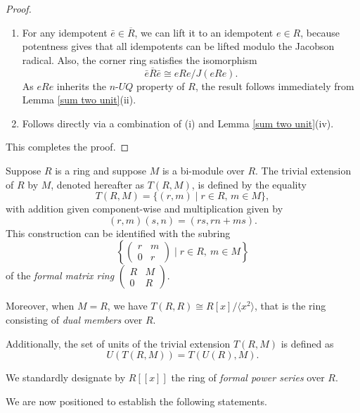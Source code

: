 \documentclass[10pt,a4paper]{amsart}
\begin{document}
\begin{proof}
\begin{enumerate}
\item
For any idempotent $\bar{e} \in \overline{R}$, we can lift it to an idempotent $e \in R$, because potentness gives that all idempotents can be lifted modulo the Jacobson radical. Also, the corner ring satisfies the isomorphism $$\bar{e}\overline{R}\bar{e} \cong eRe/J(eRe).$$ As $eRe$ inherits the $n$-$UQ$ property of $R$, the result follows immediately from Lemma \ref{sum two unit}(ii).
\item	
Follows directly via a combination of (i) and Lemma \ref{sum two unit}(iv).
\end{enumerate}

This completes the proof.
\end{proof}

Suppose \( R \) is a ring and suppose \( M \) is a bi-module over \( R \). The trivial extension of \( R \) by \( M \), denoted hereafter as \( T(R, M) \), is defined by the equality
\[
T(R, M) = \{ (r, m) \mid r \in R,\, m \in M \},
\]
with addition given component-wise and multiplication given by
\[
(r, m)(s, n) = (rs, rn + ms).
\]
This construction can be identified with the subring
\[
\left\{ \begin{pmatrix} r & m \\ 0 & r \end{pmatrix} \mid r \in R,\ m \in M \right\}
\]
of the {\it formal matrix ring} \( \begin{pmatrix} R & M \\ 0 & R \end{pmatrix} \).

Moreover, when \( M = R \), we have \( T(R, R) \cong R[x]/\langle x^2 \rangle \), that is the ring consisting of {\it dual members} over \( R \).

Additionally, the set of units of the trivial extension \( T(R, M) \) is defined as
\[
U(T(R, M)) = T(U(R), M).
\]

We standardly designate by \( R[[x]] \) the ring of {\it formal power series} over \( R \).

\medskip

We are now positioned to establish the following statements.
\end{document}
